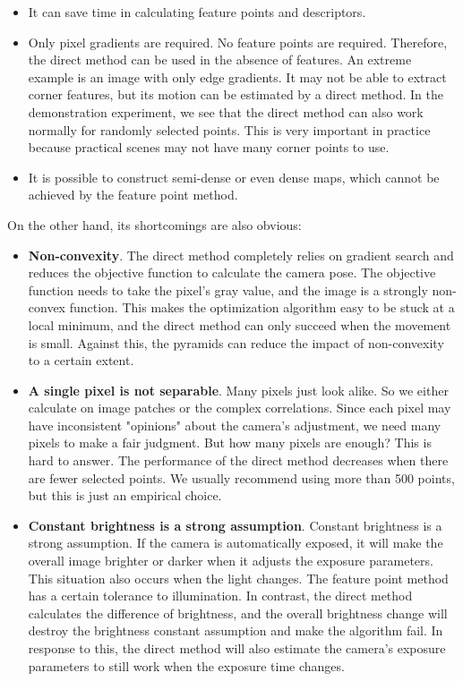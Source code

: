 \begin{itemize}
	\item It can save time in calculating feature points and descriptors.
	\item Only pixel gradients are required. No feature points are required. Therefore, the direct method can be used in the absence of features. An extreme example is an image with only edge gradients. It may not be able to extract corner features, but its motion can be estimated by a direct method. In the demonstration experiment, we see that the direct method can also work normally for randomly selected points. This is very important in practice because practical scenes may not have many corner points to use.
	\item It is possible to construct semi-dense or even dense maps, which cannot be achieved by the feature point method.
\end{itemize}

On the other hand, its shortcomings are also obvious:
\begin{itemize}
	\item \textbf{Non-convexity}. The direct method completely relies on gradient search and reduces the objective function to calculate the camera pose. The objective function needs to take the pixel's gray value, and the image is a strongly non-convex function. This makes the optimization algorithm easy to be stuck at a local minimum, and the direct method can only succeed when the movement is small. Against this, the pyramids can reduce the impact of non-convexity to a certain extent.
	\item \textbf{A single pixel is not separable}. Many pixels just look alike. So we either calculate on image patches or the complex correlations. Since each pixel may have inconsistent "opinions" about the camera's adjustment, we need many pixels to make a fair judgment. But how many pixels are enough? This is hard to answer. The performance of the direct method decreases when there are fewer selected points. We usually recommend using more than 500 points, but this is just an empirical choice.
	\item \textbf{Constant brightness is a strong assumption}. Constant brightness is a strong assumption. If the camera is automatically exposed, it will make the overall image brighter or darker when it adjusts the exposure parameters. This situation also occurs when the light changes. The feature point method has a certain tolerance to illumination. In contrast, the direct method calculates the difference of brightness, and the overall brightness change will destroy the brightness constant assumption and make the algorithm fail. In response to this, the direct method will also estimate the camera's exposure parameters \cite{Engel2016} to still work when the exposure time changes.
\end{itemize}


